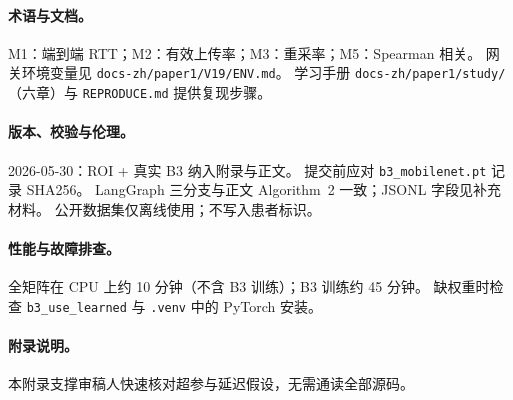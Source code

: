 \paragraph{术语与文档。}
M1：端到端 RTT；M2：有效上传率；M3：重采率；M5：Spearman 相关。
网关环境变量见 \texttt{docs-zh/paper1/V19/ENV.md}。
学习手册 \texttt{docs-zh/paper1/study/}（六章）与 \texttt{REPRODUCE.md} 提供复现步骤。

\paragraph{版本、校验与伦理。}
2026-05-30：ROI + 真实 B3 纳入附录与正文。
提交前应对 \texttt{b3\_mobilenet.pt} 记录 SHA256。
LangGraph 三分支与正文 Algorithm~2 一致；JSONL 字段见补充材料。
公开数据集仅离线使用；不写入患者标识。

\paragraph{性能与故障排查。}
全矩阵在 CPU 上约 10 分钟（不含 B3 训练）；B3 训练约 45 分钟。
缺权重时检查 \texttt{b3\_use\_learned} 与 \texttt{.venv} 中的 PyTorch 安装。

\paragraph{附录说明。}
本附录支撑审稿人快速核对超参与延迟假设，无需通读全部源码。

